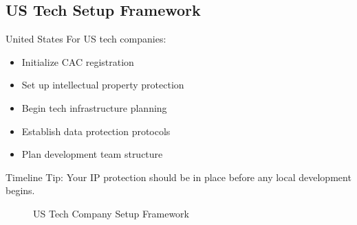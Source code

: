 \subsection{US Tech Setup Framework}\label{subsec:us-setup}
\begin{regionalbox}{United States}
For US tech companies:
\begin{itemize}
    \item Initialize CAC registration
    \item Set up intellectual property protection
    \item Begin tech infrastructure planning
    \item Establish data protection protocols
    \item Plan development team structure
\end{itemize}

Timeline Tip: Your IP protection should be in place before any local development begins.

\begin{figure}[htbp]
    \centering
    \caption{US Tech Company Setup Framework}
    \label{fig:us-tech-framework}
\end{figure}
\end{regionalbox}

